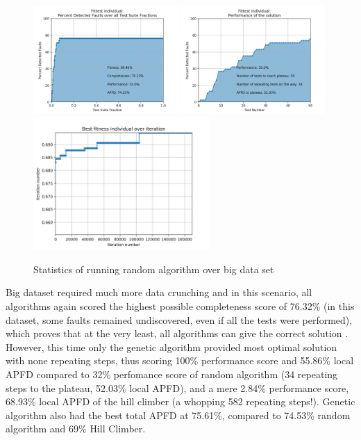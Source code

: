\documentclass[12pt]{article}
\begin{document}
\begin{figure}[H]
  \centering
  \includegraphics[width=0.49\textwidth]{random_big_apfd_total}
  \includegraphics[width=0.49\textwidth]{random_big_apfd_local}
  \includegraphics[width=0.6\textwidth]{random_big_fitness_all}
  \caption{Statistics of running random algorithm over big data set}
  \label{fig:random_big}
\end{figure}


Big dataset required much more data crunching and in this scenario, all algorithms again scored the highest possible completeness score of 76.32\% (in this dataset, some faults remained undiscovered, even if all the tests were performed), which proves that at the very least, all algorithms can give the correct solution . However, this time only the genetic algorithm provided most optimal solution with none repeating steps, thus scoring 100\%  performance score and 55.86\% local APFD  compared to 32\% perfomance score  of random algorithm (34 repeating steps to the plateau, 52.03\% local APFD), and a mere 2.84\% performance score, 68.93\% local APFD  of the hill climber (a whopping 582 repeating steps!). Genetic algorithm also had the best total APFD at 75.61\%, compared to 74.53\% random algorithm and 69\% Hill Climber.
\end{document}
